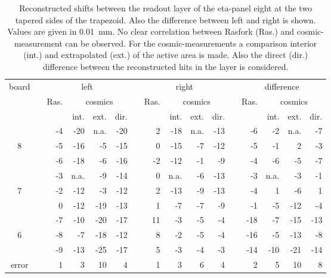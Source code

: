 \documentclass[
twoside,            %
BCOR1.4cm,          %
10pt,               %
headings=normal,    %
headsepline,        %
clearplainpage,		%
final,              %
div=14,
open=right,
bibliography=toc
]{scrreprt}
\begin{document}
\begin{table}[!h]
	\centering	
	\begin{tabular}{ccrrrrcrrrrcrrrr}
		\hline
		\hline
		board & \hspace{1mm} & \multicolumn{4}{c}{left} & \hspace{1mm} & \multicolumn{4}{c}{right} & \hspace{1mm} & \multicolumn{4}{c}{difference}
		\\
		 & & Ras. & \multicolumn{3}{c}{cosmics} & & Ras. & \multicolumn{3}{c}{cosmics} & & Ras. & \multicolumn{3}{c}{cosmics}
		\\
	 	 & &       & int. & ext. & dir. & &      & int. & ext. & dir. & &      & int. & ext. & dir.
 		\\
		\hline
		  & &   -4 &  -20 & n.a. &  -20 & &    2 &  -18 & n.a. &  -13 & &   -6 &   -2 & n.a. &   -7
		\\
		8 & &   -5 &  -16 &   -5 &  -15 & &    0 &  -15 &   -7 &  -12 & &   -5 &   -1 &    2 &   -3
		\\
		  & &   -6 &  -18 &   -6 &  -16 & &   -2 &  -12 &   -1 &   -9 & &   -4 &   -6 &   -5 &   -7
		\\
		\hline
		  & &   -3 & n.a. &   -9 &  -14 & &    0 & n.a. &   -6 &  -13 & &   -3 & n.a. &   -3 &   -1
		\\
		7 & &   -2 &  -12 &   -3 &  -12 & &    2 &  -13 &   -9 &  -13 & &   -4 &    1 &   -6 &    1
		\\
		  & &    0 &  -12 &  -19 &  -13 & &    1 &   -7 &   -7 &   -9 & &   -1 &   -5 &  -12 &   -4
		\\
		\hline
		  & &   -7 &  -10 &  -20 &  -17 & &   11 &   -3 &   -5 &   -4 & &  -18 &   -7 &  -15 &  -13
		\\
		6 & &   -8 &   -7 &  -18 &  -12 & &    8 &   -2 &   -5 &   -4 & &  -16 &   -5 &  -13 &   -8
		\\
		  & &   -9 &  -13 &  -25 &  -17 & &    5 &   -3 &   -4 &   -3 & &  -14 &  -10 &  -21 &  -14
 		\\
	 	\hline
	 	error & & 1 & 3 & 10 & 4 & & 1 & 3 & 6 & 4 & & 2 & 5 & 10 & 8
 		\\
	 	\hline
		\hline
	\end{tabular}
	\caption{
		Reconstructed shifts between the readout layer of the eta-panel eight at the two tapered sides of the trapezoid.
		Also the difference between left and right is shown.
		Values are given in \SI{0.01}{mm}.
		No clear correlation between Rasfork (Ras.) and cosmic-measurement can be observed.
		For the cosmic-measurements a comparison interior (int.) and extrapolated (ext.) of the active area is made.
		Also the direct (dir.) difference between the reconstructed hits in the layer is considered.
	}
	\label{eta8reconstructedShifts}
\end{table}
\end{document}
